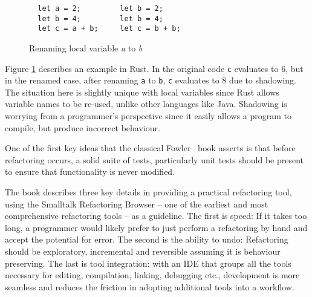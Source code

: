\begin{figure}[h]
\begin{verbatim}
  let a = 2;         let b = 2;
  let b = 4;         let b = 4;
  let c = a + b;     let c = b + b;
\end{verbatim}
\caption{Renaming local variable \emph{a} to \emph{b}}
\label{Fig:opdyke}
\end{figure}

Figure \ref{Fig:opdyke} describes an example in Rust. In the original code {\verb|c|} evaluates to 6, but in the renamed case, after renaming {\verb|a|} to {\verb|b|}, {\verb|c|} evaluates to 8 due to shadowing. The situation here is slightly unique with local variables since Rust allows variable names to be re-used, unlike other languages like Java. Shadowing is worrying from a programmer's perspective since it easily allows a program to compile, but produce incorrect behaviour.

One of the first key ideas that the classical Fowler~\cite{fowler99} book asserts is that before refactoring occurs, a solid suite of tests, particularly unit tests should be present to ensure that functionality is never modified.

The book describes three key details in providing a practical refactoring tool, using the Smalltalk Refactoring Browser -- one of the earliest and most comprehensive refactoring tools -- as a guideline. The first is speed: If it takes too long, a programmer would likely prefer to just perform a refactoring by hand and accept the potential for error. The second is the ability to undo: Refactoring should be exploratory, incremental and reversible assuming it is behaviour preserving. The last is tool integration: with an IDE that groups all the tools necessary for editing, compilation, linking, debugging etc., development is more seamless and reduces the friction in adopting additional tools into a workflow. 

